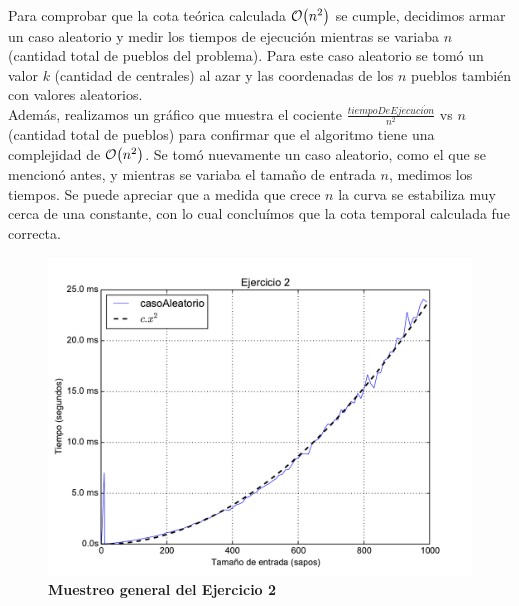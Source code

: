 \documentclass[11pt, a4paper, twoside]{article}
\begin{document}
{}

Para comprobar que la cota teórica calculada $\mathop{}\mathopen{}\mathcal{O}\mathopen{}\left(n^2\right)$ se cumple, decidimos armar un caso aleatorio y 
medir los tiempos de ejecución mientras se variaba $n$ (cantidad total de pueblos del problema). 
Para este caso aleatorio se tomó un valor $k$ (cantidad de centrales) al azar y las coordenadas de los  $n$ 
pueblos también con valores aleatorios. \\
Además, realizamos un gráfico que muestra el cociente $\frac{tiempoDeEjecuci\acute{o}n}{n^2}$ vs $n$ (cantidad
total de pueblos) para confirmar que el algoritmo tiene una complejidad de $\mathop{}\mathopen{}\mathcal{O}\mathopen{}\left(n^2\right)$. 
Se tomó nuevamente un caso aleatorio, como el que se mencionó antes, y mientras se variaba el tamaño de entrada $n$, 
medimos los tiempos. Se puede apreciar que a medida que crece $n$ la curva se estabiliza muy cerca de una constante, 
con lo cual concluímos que la cota temporal calculada fue correcta. \\
\clearpage

\begin{figure}[H]
   \begin{center}
   \includegraphics[width=1.4\textwidth, angle=90]{../ej2/graficos/test_tiempoLiso.pdf}
   \caption{\textbf{Muestreo general del Ejercicio 2}}
   \label{fig:ej2-graf-1}
   \end{center}
\end{figure}
\clearpage
\end{document}
